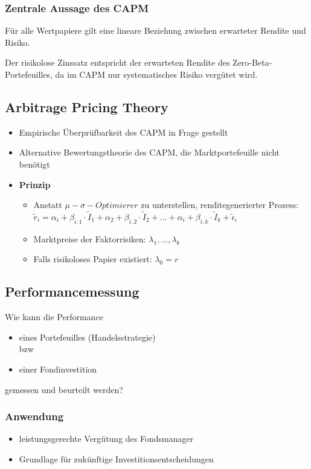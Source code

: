 \subsubsection{Zentrale Aussage des CAPM}
Für alle Wertpapiere gilt eine lineare Beziehung zwischen erwarteter Rendite und Risiko.

Der risikolose Zinssatz entspricht der erwarteten Rendite des Zero-Beta-Portefeuilles, da im CAPM nur systematisches Risiko vergütet wird.


\subsection{Arbitrage Pricing Theory}
\begin{itemize}
	\item Empirische Überprüfbarkeit des CAPM in Frage gestellt
	\item Alternative Bewertungstheorie des CAPM, die Marktportefeuille nicht benötigt
	\item \textbf{Prinzip}
	\begin{itemize}
		\item Anstatt \(\mu - \sigma - Optimierer\) zu unterstellen, renditegenerierter Prozess: \(\tilde{r}_i = \alpha_i + \beta_{i,1} \cdot \tilde{I}_1 + \alpha_2 + \beta_{i,2} \cdot \tilde{I}_2 + \dots + \alpha_i + \beta_{i,k} \cdot \tilde{I}_k + \tilde{\epsilon}_i\)
		\item Marktpreise der Faktorrisiken: \(\lambda_1, \dots, \lambda_k\)
		\item Falls risikoloses Papier existiert: \(\lambda_0 = r\)
	\end{itemize}
\end{itemize}


\subsection{Performancemessung}
Wie kann die Performance
\begin{itemize}
	\item eines Portefeuilles (Handelsstrategie)\\
	bzw
	\item einer Fondinvestition
\end{itemize}
gemessen und beurteilt werden?

\subsubsection{Anwendung}
\begin{itemize}
	\item leistungsgerechte Vergütung des Fondsmanager
	\item Grundlage für zukünftige Investitionsentscheidungen
\end{itemize}

